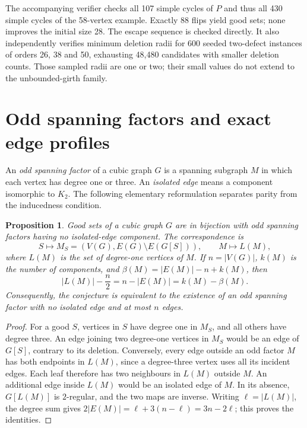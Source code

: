 \documentclass[11pt]{article}
\newtheorem{proposition}[theorem]{Proposition}
\begin{document}
The accompanying verifier checks all 107 simple cycles of $P$
and thus all 430 simple cycles of the 58-vertex example. Exactly
88 flips yield good sets; none improves the initial size 28.
The escape sequence is checked directly. It also independently
verifies minimum deletion radii for 600 seeded two-defect
instances of orders 26, 38 and 50, exhausting 48,480 candidates
with smaller deletion counts. Those sampled radii are one or two;
their small values do not extend to the unbounded-girth family.

\section{Odd spanning factors and exact edge profiles}
An \emph{odd spanning factor} of a cubic graph $G$ is a spanning
subgraph $M$ in which each vertex has degree one or three. An
\emph{isolated edge} means a component isomorphic to $K_2$.
The following elementary reformulation
separates parity from the inducedness condition.

\begin{proposition}\label{prop:odd-factor}
Good sets of a cubic graph $G$ are in bijection with odd spanning
factors having no isolated-edge component. The correspondence is
\[
 S\longmapsto M_S=(V(G),E(G)\setminus E(G[S])),
 \qquad M\longmapsto L(M),
\]
where $L(M)$ is the set of degree-one vertices of $M$.
If $n=|V(G)|$, $k(M)$ is the number of components, and
$\beta(M)=|E(M)|-n+k(M)$, then
\begin{equation}\label{eq:factor-surplus}
 |L(M)|-\frac n2=n-|E(M)|=k(M)-\beta(M).
\end{equation}
Consequently, the conjecture is equivalent to the existence of an
odd spanning factor with no isolated edge and at most $n$ edges.
\end{proposition}
\begin{proof}
For a good $S$, vertices in $S$ have degree one in $M_S$, and all
others have degree three. An edge joining two degree-one vertices
in $M_S$ would be an edge of $G[S]$, contrary to its deletion.
Conversely, every edge outside an odd factor $M$ has both endpoints
in $L(M)$, since a degree-three vertex uses all its incident edges.
Each leaf therefore has two neighbours in $L(M)$ outside $M$.
An additional edge inside $L(M)$ would be an isolated edge of $M$.
In its absence, $G[L(M)]$ is $2$-regular, and the two maps are inverse.
Writing $\ell=|L(M)|$, the degree sum gives
$2|E(M)|=\ell+3(n-\ell)=3n-2\ell$; this proves the identities.
\end{proof}
\end{document}
